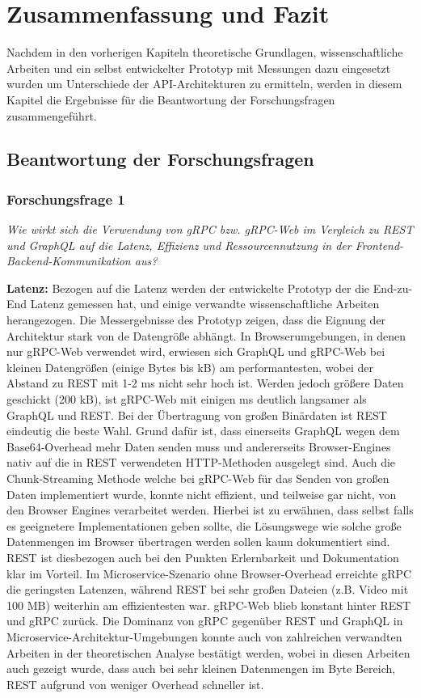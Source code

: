 \chapter{Zusammenfassung und Fazit}
\label{chap:intro}
Nachdem in den vorherigen Kapiteln theoretische Grundlagen, wissenschaftliche Arbeiten und ein selbst entwickelter Prototyp mit Messungen dazu eingesetzt wurden  um Unterschiede der API-Architekturen zu ermitteln, werden in diesem Kapitel die Ergebnisse für die Beantwortung der Forschungsfragen zusammengeführt.
\chapterstart
\section{Beantwortung der Forschungsfragen}
\subsection*{Forschungsfrage 1}
\textit{Wie wirkt sich die Verwendung von gRPC bzw. gRPC-Web im Vergleich zu REST und GraphQL auf die Latenz, Effizienz und Ressourcennutzung in der Frontend-Backend-Kommunikation aus?}

\textbf{Latenz:} 
Bezogen auf die Latenz werden der entwickelte Prototyp der die End-zu-End Latenz gemessen hat, und einige verwandte wissenschaftliche Arbeiten herangezogen.
Die Messergebnisse des Prototyp zeigen, dass die Eignung der Architektur stark von de Datengröße abhängt. 
In Browserumgebungen, in denen nur gRPC-Web verwendet wird, erwiesen sich GraphQL und gRPC-Web bei kleinen Datengrößen (einige Bytes bis kB) am performantesten, wobei der Abstand zu REST mit 1-2 ms nicht sehr hoch ist. 
Werden jedoch größere Daten geschickt (200 kB), ist gRPC-Web mit einigen ms deutlich langsamer als GraphQL und REST. Bei der Übertragung von großen Binärdaten ist REST eindeutig die beste Wahl. Grund dafür ist, dass einerseits GraphQL wegen dem Base64-Overhead mehr Daten senden muss und andererseits Browser-Engines nativ auf die in REST verwendeten HTTP-Methoden ausgelegt sind. Auch die Chunk-Streaming Methode welche bei gRPC-Web für das Senden von großen Daten implementiert wurde, konnte nicht effizient, und teilweise gar nicht, von den Browser Engines verarbeitet werden. Hierbei ist zu erwähnen, dass selbst falls es geeignetere Implementationen geben sollte, die Lösungswege wie solche große Datenmengen im Browser übertragen werden sollen kaum dokumentiert sind. REST ist diesbezogen auch bei den Punkten Erlernbarkeit und Dokumentation klar im Vorteil.
Im Microservice-Szenario ohne Browser-Overhead erreichte gRPC die geringsten Latenzen, während REST bei sehr großen Dateien (z.B. Video mit 100 MB) weiterhin am effizientesten war. gRPC-Web blieb konstant hinter REST und gRPC zurück.
Die Dominanz von gRPC gegenüber REST und GraphQL in Microservice-Architektur-Umgebungen konnte auch von zahlreichen verwandten Arbeiten in der theoretischen Analyse bestätigt werden, wobei in diesen Arbeiten auch gezeigt wurde, dass auch bei sehr kleinen Datenmengen im Byte Bereich, REST aufgrund von weniger Overhead schneller ist.

